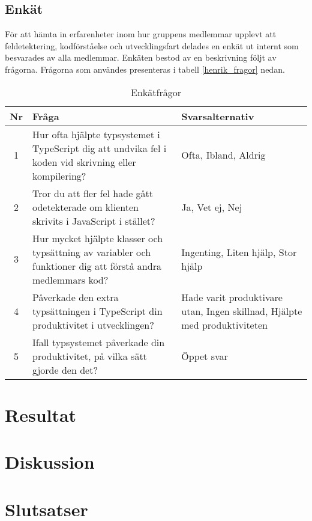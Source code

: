 \subsection{Enkät}
För att hämta in erfarenheter inom hur gruppens medlemmar upplevt att feldetektering, kodförståelse och utvecklingsfart delades en enkät ut internt som besvarades av alla medlemmar. Enkäten bestod av en beskrivning följt av frågorna. Frågorna som användes presenteras i tabell \ref{henrik_fragor} nedan.

\begin {table}[h]
\caption {Enkätfrågor} \label{tab:henrik_fragor}
\begin{tabular}{|c|p{6cm}|p{8cm}|}
  \hline
  Nr & Fråga & Svarsalternativ \\
  \hline
  1 & Hur ofta hjälpte typsystemet i TypeScript dig att undvika fel i koden vid skrivning eller kompilering? & Ofta, Ibland, Aldrig
  \\
  \hline
  2 & Tror du att fler fel hade gått odetekterade om klienten skrivits i JavaScript i stället? & Ja, Vet ej, Nej
  \\
  \hline
  3 & Hur mycket hjälpte klasser och typsättning av variabler och funktioner dig att förstå andra medlemmars kod? & Ingenting, Liten hjälp, Stor hjälp
  \\
  \hline
  4 & Påverkade den extra typsättningen i TypeScript din produktivitet i utvecklingen? & Hade varit produktivare utan, Ingen skillnad, Hjälpte med produktiviteten 
  \\
  \hline
  5 & Ifall typsystemet påverkade din produktivitet, på vilka sätt gjorde den det? & Öppet svar
  \\
  \hline
\end{tabular}
\end{table}

\section{Resultat}
\section{Diskussion}
\section{Slutsatser}



